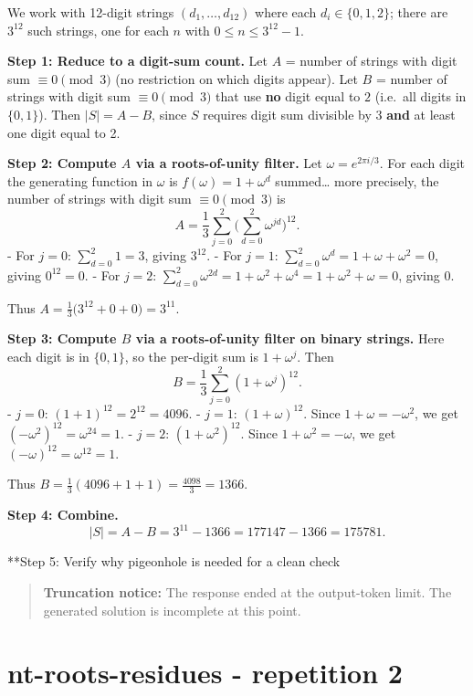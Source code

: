 \documentclass[
  11pt,
  letterpaper,
]{article}
\begin{document}
We work with 12-digit strings \((d_1,\dots,d_{12})\) where each
\(d_i \in \{0,1,2\}\); there are \(3^{12}\) such strings, one for each
\(n\) with \(0 \le n \le 3^{12}-1\).

\textbf{Step 1: Reduce to a digit-sum count.} Let \(A\) = number of
strings with digit sum \(\equiv 0 \pmod 3\) (no restriction on which
digits appear). Let \(B\) = number of strings with digit sum
\(\equiv 0 \pmod 3\) that use \textbf{no} digit equal to \(2\) (i.e.~all
digits in \(\{0,1\}\)). Then \(|S| = A - B\), since \(S\) requires digit
sum divisible by 3 \textbf{and} at least one digit equal to 2.

\textbf{Step 2: Compute \(A\) via a roots-of-unity filter.} Let
\(\omega = e^{2\pi i/3}\). For each digit the generating function in
\(\omega\) is \(f(\omega)=1+\omega^d\) summed\ldots{} more precisely,
the number of strings with digit sum \(\equiv 0 \pmod 3\) is \[
A = \frac{1}{3}\sum_{j=0}^{2} \Big(\sum_{d=0}^{2}\omega^{jd}\Big)^{12}.
\] - For \(j=0\): \(\sum_{d=0}^2 1 = 3\), giving \(3^{12}\). - For
\(j=1\): \(\sum_{d=0}^2 \omega^{d} = 1+\omega+\omega^2 = 0\), giving
\(0^{12}=0\). - For \(j=2\):
\(\sum_{d=0}^2 \omega^{2d} = 1+\omega^2+\omega^4 = 1+\omega^2+\omega = 0\),
giving \(0\).

Thus \(A = \frac{1}{3}\big(3^{12}+0+0\big) = 3^{11}\).

\textbf{Step 3: Compute \(B\) via a roots-of-unity filter on binary
strings.} Here each digit is in \(\{0,1\}\), so the per-digit sum is
\(1+\omega^{j}\). Then \[
B = \frac{1}{3}\sum_{j=0}^{2}(1+\omega^{j})^{12}.
\] - \(j=0\): \((1+1)^{12}=2^{12}=4096\). - \(j=1\):
\((1+\omega)^{12}\). Since \(1+\omega=-\omega^2\), we get
\((-\omega^2)^{12}=\omega^{24}=1\). - \(j=2\): \((1+\omega^2)^{12}\).
Since \(1+\omega^2=-\omega\), we get \((-\omega)^{12}=\omega^{12}=1\).

Thus \(B = \frac{1}{3}(4096+1+1) = \frac{4098}{3}=1366\).

\textbf{Step 4: Combine.} \[
|S| = A - B = 3^{11} - 1366 = 177147 - 1366 = 175781.
\]

**Step 5: Verify why pigeonhole is needed for a clean check

\begin{quote}
\textbf{Truncation notice:} The response ended at the output-token
limit. The generated solution is incomplete at this point.
\end{quote}

\clearpage

\section{nt-roots-residues - repetition
2}\label{nt-roots-residues---repetition-2}
\end{document}
